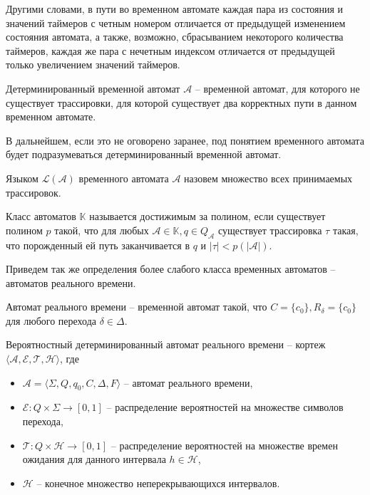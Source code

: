 \documentclass[times,specification,annotation]{itmo-student-thesis}
\begin{document}
Другими словами, в пути во временном автомате каждая пара из состояния и значений таймеров с 
четным номером отличается от предыдущей изменением состояния автомата, а также, возможно, сбрасыванием некоторого количества таймеров, 
каждая же пара с нечетным индексом отличается от предыдущей только увеличением значений таймеров.

\begin{definition}
  Детерминированный временной автомат $\mathcal{A}$ -- временной автомат, для которого не существует трассировки, для которой существует два корректных пути в данном временном автомате.
  \label{DTA}
\end{definition}

В дальнейшем, если это не оговорено заранее, под понятием временного автомата будет подразумеваться детерминированный временной автомат.

\begin{definition}
  Языком $\mathcal{L}(\mathcal{A})$ временного автомата $\mathcal{A}$ назовем множество всех принимаемых трассировок.
\end{definition}

\begin{definition}
  Класс автоматов $\mathbb{K}$ называется достижимым за полином, если существует полином $p$ такой, что для любых
  $\mathcal{A} \in \mathbb{K}, q \in Q_{\mathcal{A}}$ существует трассировка $\tau$ такая, что порожденный ей путь заканчивается в $q$ и $|\tau| < p(|\mathcal{A}|)$.
\end{definition}

Приведем так же определения более слабого класса временных автоматов -- автоматов реального времени.

\begin{definition}
  Автомат реального времени -- временной автомат такой, что $C = \{c_0\}, R_{\delta} = \{c_0\}$ для любого перехода $\delta \in \Delta$.
  \label{rti}
\end{definition}

\begin{definition}
  Вероятностный детерминированный автомат реального времени -- кортеж $\langle \mathcal{A}, \mathcal{E}, \mathcal{T}, \mathcal{H} \rangle$, где
  \begin{itemize}
    \item $\mathcal{A} = \langle \Sigma, Q, q_0, C, \Delta, F \rangle$ -- автомат реального времени,
    \item $\mathcal{E}: Q \times \Sigma \rightarrow [0, 1]$ -- распределение вероятностей на множестве символов перехода,
    \item $\mathcal{T}: Q \times \mathcal{H} \rightarrow [0, 1]$ -- распределение вероятностей на множестве времен ожидания для данного интервала $h \in \mathcal{H}$,
    \item $\mathcal{H}$ -- конечное множество неперекрывающихся интервалов.
  \end{itemize}
  \label{rti++}
\end{definition}
\end{document}
